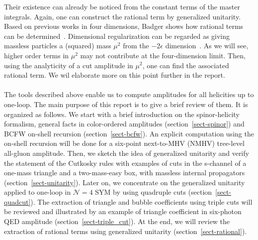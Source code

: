 Their existence can already be noticed from the constant terms of the master integrals.
Again, one can construct the rational term by generalized unitarity. 
Based on previous works in four dimensions, Badger shows how rational terms can be determined~\cite{Badger:2008cm}.
Dimensional regularization can be regarded as giving massless particles a (squared) mass $\mu^2$ from the $-2\epsilon$ dimension~\cite{Bern:1995db}.
As we will see, higher order terms in $\mu^2$ may not contribute at the four-dimension limit.
Then, using the analyticity of a cut amplitude in $\mu^2$, one can find the associated rational term.
We wil elaborate more on this point further in the report.
\\\\
The tools described above enable us to compute amplitudes for all helicities up to one-loop.
The main purpose of this report is to give a brief review of them.
It is organized as follows.
We start with a brief introduction on the spinor-helicity formalism, general facts in color-ordered amplitudes (section~\ref{sect-spinor}) and BCFW on-shell recursion (section~\ref{sect-bcfw}).
An explicit computation using the on-shell recursion will be done for a six-point next-to-MHV (NMHV) tree-level all-gluon amplitude. 
Then, we sketch the idea of generalized unitarity and verify the statement of the Cutkosky rules with examples of cuts in the s-channel of a one-mass triangle and a two-mass-easy box, with massless internal propagators (section~\ref{sect-unitarity}).
Later on, we concentrate on the generalized unitarity applied to one-loop in $\mathcal{N}=4$ SYM by using quadruple cuts (section~\ref{sect-quadcut}).
The extraction of triangle and bubble coefficients using triple cuts will be reviewed and illustrated by an example of triangle coefficient in six-photon QED amplitude (section~\ref{sect-triple_cut}).
At the end, we will review the extraction of rational terms using generalized unitarity (section~\ref{sect-rational}).
%
